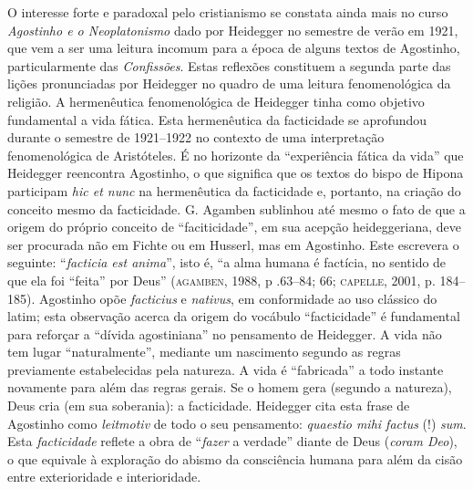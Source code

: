 O interesse forte e paradoxal pelo cristianismo se constata ainda
mais no curso \emph{Agostinho e o Neoplatonismo} dado por
Heidegger no semestre de verão em 1921, que vem a ser uma
leitura incomum para a época de alguns textos de Agostinho,
particularmente das \emph{Confissões}. Estas reflexões
constituem a segunda parte das lições pronunciadas por Heidegger
no quadro de uma leitura fenomenológica da religião. A
hermenêutica fenomenológica de Heidegger tinha como objetivo
fundamental a vida fática. Esta hermenêutica da facticidade se
aprofundou durante o semestre de 1921--1922 no contexto de uma
interpretação fenomenológica de Aristóteles. É no horizonte da
“experiência fática da vida” que Heidegger reencontra Agostinho,
o que significa que os textos do bispo de Hipona participam
\emph{hic et nunc} na hermenêutica da facticidade e, portanto,
na criação do conceito mesmo da facticidade. G. Agamben
sublinhou até mesmo o fato de que a origem do próprio conceito
de “faciticidade”, em sua acepção heideggeriana, deve ser
procurada não em Fichte ou em Husserl, mas em Agostinho. Este
escrevera o seguinte: “\emph{facticia est anima}”, isto é, “a
alma humana é factícia, no sentido de que ela foi ``feita'' por
Deus” (\textsc{agamben}, 1988, p .63--84; 66; \textsc{capelle}, 2001, p. 184--185).
Agostinho opõe \emph{facticius} e \emph{nativus}, em
conformidade ao uso clássico do latim; esta observação acerca da
origem do vocábulo “facticidade” é fundamental para reforçar a
“dívida agostiniana” no pensamento de Heidegger. A vida não tem
lugar “naturalmente”, mediante um nascimento segundo as regras
previamente estabelecidas pela natureza. A vida é “fabricada” a
todo instante novamente para além das regras gerais. Se o homem
gera (segundo a natureza), Deus cria (em sua soberania): a
facticidade. Heidegger cita esta frase de Agostinho como
\emph{leitmotiv} de todo o seu pensamento: \emph{quaestio
mihi factus} (!) \emph{sum}. Esta \emph{facticidade} reflete
a obra de “\emph{fazer} a verdade” diante de Deus
(\emph{coram Deo}), o que equivale à exploração do abismo da
consciência humana para além da cisão entre exterioridade e
interioridade.  

